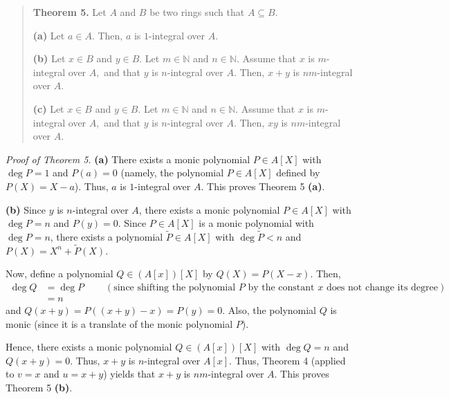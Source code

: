 \documentclass[12pt,final,notitlepage,onecolumn]{article}%
\begin{document}
\begin{quote}
\textbf{Theorem 5.} Let $A$ and $B$ be two rings such that $A\subseteq B$.

\textbf{(a)} Let $a\in A$. Then, $a$ is $1$-integral over $A$.

\textbf{(b)} Let $x\in B$ and $y\in B$. Let $m\in\mathbb{N}$ and
$n\in\mathbb{N}$. Assume that $x$ is $m$-integral over $A,$ and that $y$ is
$n$-integral over $A$. Then, $x+y$ is $nm$-integral over $A$.

\textbf{(c)} Let $x\in B$ and $y\in B$. Let $m\in\mathbb{N}$ and
$n\in\mathbb{N}$. Assume that $x$ is $m$-integral over $A,$ and that $y$ is
$n$-integral over $A$. Then, $xy$ is $nm$-integral over $A$.
\end{quote}

\textit{Proof of Theorem 5.} \textbf{(a)} There exists a monic polynomial
$P\in A\left[  X\right]  $ with $\deg P=1$ and $P\left(  a\right)  =0$
(namely, the polynomial $P\in A\left[  X\right]  $ defined by $P\left(
X\right)  =X-a$). Thus, $a$ is $1$-integral over $A$. This proves Theorem 5
\textbf{(a)}.

\textbf{(b)} Since $y$ is $n$-integral over $A$, there exists a monic
polynomial $P\in A\left[  X\right]  $ with $\deg P=n$ and $P\left(  y\right)
=0$. Since $P\in A\left[  X\right]  $ is a monic polynomial with $\deg P=n$,
there exists a polynomial $\widetilde{P}\in A\left[  X\right]  $ with
$\deg\widetilde{P}<n$ and $P\left(  X\right)  =X^{n}+\widetilde{P}\left(
X\right)  $.

Now, define a polynomial $Q\in\left(  A\left[  x\right]  \right)  \left[
X\right]  $ by $Q\left(  X\right)  =P\left(  X-x\right)  $. Then,%
\begin{align*}
\deg Q  &  =\deg P\ \ \ \ \ \ \ \ \ \ \left(  \text{since shifting the
polynomial }P\text{ by the constant }x\text{ does not change its
degree}\right) \\
&  =n
\end{align*}
and $Q\left(  x+y\right)  =P\left(  \left(  x+y\right)  -x\right)  =P\left(
y\right)  =0$. Also, the polynomial $Q$ is monic (since it is a translate of
the monic polynomial $P$).

Hence, there exists a monic polynomial $Q\in\left(  A\left[  x\right]
\right)  \left[  X\right]  $ with $\deg Q=n$ and $Q\left(  x+y\right)  =0$.
Thus, $x+y$ is $n$-integral over $A\left[  x\right]  $. Thus, Theorem 4
(applied to $v=x$ and $u=x+y$) yields that $x+y$ is $nm$-integral over $A$.
This proves Theorem 5 \textbf{(b)}.
\end{document}
